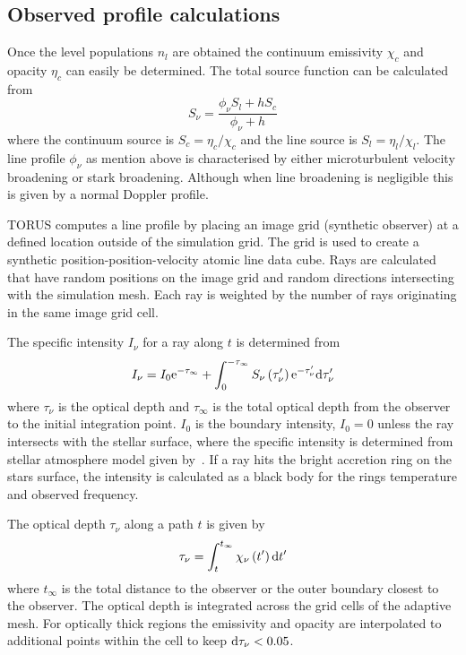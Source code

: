 \documentclass[fleqn,usenatbib]{mnras}
\begin{document}
\subsection{Observed profile calculations}
\label{sec:profilecalculations}
Once the level populations $n_{l}$ are obtained the continuum emissivity $\chi_c$ and opacity $\eta_c$ can easily be determined. The total source function can be calculated from
\begin{equation}
    S_{\nu} = \frac{\phi_{\nu}S_l+hS_{c}}{\phi_{\nu}+h}
\end{equation}
where the continuum source is $S_{c}=\eta_{c}/\chi_{c}$ and the line source is $S_{l}=\eta_{l}/\chi_{l}$. The line profile $\phi_{\nu}$ as mention above is characterised by either microturbulent velocity broadening or stark broadening. Although when line broadening is negligible this is given by a normal Doppler profile.

TORUS computes a line profile by placing an image grid (synthetic observer) at a defined location outside of the simulation grid. The grid is used to create a synthetic position-position-velocity atomic line data cube. Rays are calculated that have random positions on the image grid and random directions intersecting with the simulation mesh. Each ray is weighted by the number of rays originating in the same image grid cell.

The specific intensity $I_{\nu}$ for a ray along $t$ is determined from
\begin{equation}
I_{\nu} = I_{0}{\rm e}^{-\tau_{\infty}} + \int^{-\tau_{\infty}}_{0}S_{\nu}\left(\tau_{\nu}'\right){\rm e}^{-\tau_{\nu}'}{\rm d}\tau_{\nu}'
\end{equation}
where $\tau_{\nu}$ is the optical depth and $\tau_{\infty}$ is the total optical depth from the observer to the initial integration point. $I_0$ is the boundary intensity, $I_0=0$ unless the ray intersects with the stellar surface, where the specific intensity is determined from stellar atmosphere model given by~\citet{1979ApJS...40....1K}. If a ray hits the bright accretion ring on the stars surface, the intensity is calculated as a black body for the rings temperature and observed frequency.

The optical depth $\tau_{\nu}$ along a path $t$ is given by
\begin{equation}
    \tau_{\nu} = \int_{t}^{t_{\infty}} \chi_{\nu}\left(t' \right){\rm d}t'
\end{equation}
where $t_{\infty}$ is the total distance to the observer or the outer boundary closest to the observer. The optical depth is integrated across the grid cells of the adaptive mesh. For optically thick regions the emissivity and opacity are interpolated to additional points within the cell to keep ${\rm d}\tau_{\nu} < 0.05$. 
\end{document}
